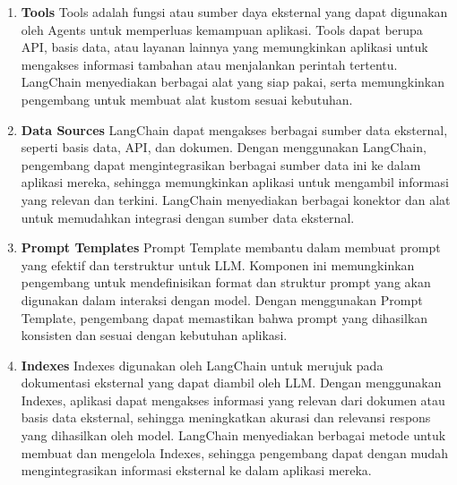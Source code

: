 \begin{enumerate}
	\item \textbf{Tools} \newline
	      Tools adalah fungsi atau sumber daya eksternal yang dapat digunakan oleh Agents untuk memperluas kemampuan aplikasi. Tools dapat berupa API, basis data, atau layanan lainnya yang memungkinkan aplikasi untuk mengakses informasi tambahan atau menjalankan perintah tertentu. LangChain menyediakan berbagai alat yang siap pakai, serta memungkinkan pengembang untuk membuat alat kustom sesuai kebutuhan.

	\item \textbf{Data Sources} \newline
	      LangChain dapat mengakses berbagai sumber data eksternal, seperti basis data, API, dan dokumen. Dengan menggunakan LangChain, pengembang dapat mengintegrasikan berbagai sumber data ini ke dalam aplikasi mereka, sehingga memungkinkan aplikasi untuk mengambil informasi yang relevan dan terkini. LangChain menyediakan berbagai konektor dan alat untuk memudahkan integrasi dengan sumber data eksternal.

	\item \textbf{Prompt Templates} \newline
	      Prompt Template membantu dalam membuat prompt yang efektif dan terstruktur untuk LLM. Komponen ini memungkinkan pengembang untuk mendefinisikan format dan struktur prompt yang akan digunakan dalam interaksi dengan model. Dengan menggunakan Prompt Template, pengembang dapat memastikan bahwa prompt yang dihasilkan konsisten dan sesuai dengan kebutuhan aplikasi.

	\item \textbf{Indexes} \newline
	      Indexes digunakan oleh LangChain untuk merujuk pada dokumentasi eksternal yang dapat diambil oleh LLM. Dengan menggunakan Indexes, aplikasi dapat mengakses informasi yang relevan dari dokumen atau basis data eksternal, sehingga meningkatkan akurasi dan relevansi respons yang dihasilkan oleh model. LangChain menyediakan berbagai metode untuk membuat dan mengelola Indexes, sehingga pengembang dapat dengan mudah mengintegrasikan informasi eksternal ke dalam aplikasi mereka.
\end{enumerate}
